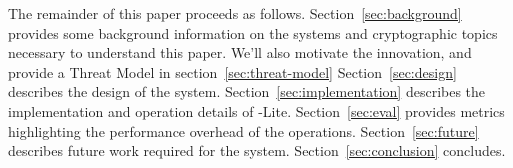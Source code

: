 
The remainder of this paper proceeds as follows.
%
Section~\ref{sec:background} provides some background information on the systems and cryptographic topics necessary to understand this paper. We'll also motivate the innovation, and provide a Threat Model in section~\ref{sec:threat-model}
%
Section~\ref{sec:design} describes the design of the \SystemName system.
%
Section~\ref{sec:implementation} describes the implementation and operation details of \SystemName-Lite.
%
Section~\ref{sec:eval} provides metrics highlighting the performance overhead of the \SystemName operations.
%
Section~\ref{sec:future} describes future work required for the \SystemName system.
%
Section~\ref{sec:conclusion} concludes.


